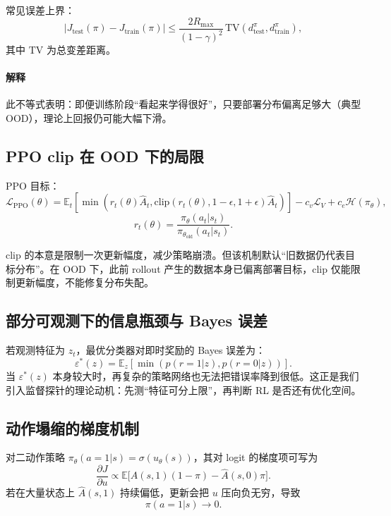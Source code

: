 ﻿\documentclass[11pt,a4paper]{ctexart}
\begin{document}
常见误差上界：
\begin{equation}
|J_{\text{test}}(\pi)-J_{\text{train}}(\pi)|
\le
\frac{2R_{\max}}{(1-\gamma)^2}
\,\mathrm{TV}(d_{\text{test}}^{\pi},d_{\text{train}}^{\pi}),
\end{equation}
其中 $\mathrm{TV}$ 为总变差距离。

\paragraph{解释}
此不等式表明：即便训练阶段“看起来学得很好”，只要部署分布偏离足够大（典型 OOD），理论上回报仍可能大幅下滑。

\subsection{PPO clip 在 OOD 下的局限}
PPO 目标：
\begin{equation}
\mathcal{L}_{\text{PPO}}(\theta)=
\mathbb{E}_t\left[
\min\left(r_t(\theta)\hat A_t,
\mathrm{clip}(r_t(\theta),1-\epsilon,1+\epsilon)\hat A_t\right)
\right]
-c_v\mathcal{L}_V+c_e\mathcal{H}(\pi_\theta),
\end{equation}
\begin{equation}
r_t(\theta)=\frac{\pi_\theta(a_t|s_t)}{\pi_{\theta_{\text{old}}}(a_t|s_t)}.
\end{equation}

clip 的本意是限制一次更新幅度，减少策略崩溃。但该机制默认“旧数据仍代表目标分布”。在 OOD 下，此前 rollout 产生的数据本身已偏离部署目标，clip 仅能限制更新幅度，不能修复分布失配。

\subsection{部分可观测下的信息瓶颈与 Bayes 误差}
若观测特征为 $z_t$，最优分类器对即时奖励的 Bayes 误差为：
\begin{equation}
\varepsilon^*(z)=
\mathbb{E}_{z}\left[
\min\left(p(r=1|z),p(r=0|z)\right)
\right].
\end{equation}
当 $\varepsilon^*(z)$ 本身较大时，再复杂的策略网络也无法把错误率降到很低。这正是我们引入监督探针的理论动机：先测“特征可分上限”，再判断 RL 是否还有优化空间。

\subsection{动作塌缩的梯度机制}
对二动作策略 $\pi_\theta(a=1|s)=\sigma(u_\theta(s))$，其对 logit 的梯度项可写为
\begin{equation}
\frac{\partial J}{\partial u}
\propto
\mathbb{E}\big[\hat A(s,1)(1-\pi)-\hat A(s,0)\pi\big].
\end{equation}
若在大量状态上 $\hat A(s,1)$ 持续偏低，更新会把 $u$ 压向负无穷，导致
\begin{equation}
\pi(a=1|s)\to 0.
\end{equation}
\end{document}
